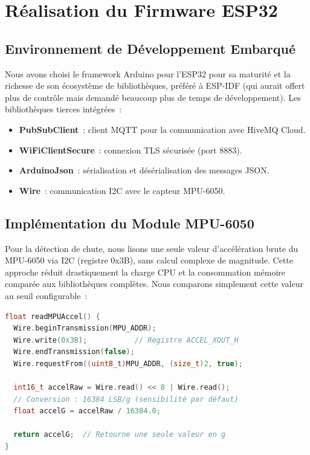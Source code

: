 \documentclass[12pt, a4paper]{report}
\begin{document}
\section{Réalisation du Firmware ESP32}

\subsection{Environnement de Développement Embarqué}

Nous avons choisi le framework Arduino pour l'ESP32 pour sa maturité et la richesse
de son écosystème de bibliothèques, préféré à ESP-IDF (qui aurait offert plus de
contrôle mais demandé beaucoup plus de temps de développement). Les bibliothèques
tierces intégrées~:

\begin{itemize}
  \item \textbf{PubSubClient}~: client MQTT pour la communication avec HiveMQ Cloud.
  \item \textbf{WiFiClientSecure}~: connexion TLS sécurisée (port 8883).
  \item \textbf{ArduinoJson}~: sérialisation et désérialisation des messages JSON.
  \item \textbf{Wire}~: communication I2C avec le capteur MPU-6050.
\end{itemize}

\subsection{Implémentation du Module MPU-6050}

Pour la détection de chute, nous lisons une seule valeur d'accélération brute du
MPU-6050 via I2C (registre 0x3B), sans calcul complexe de magnitude. Cette approche
réduit drastiquement la charge CPU et la consommation mémoire comparée aux bibliothèques
complètes. Nous comparons simplement cette valeur au seuil configurable~:

\begin{lstlisting}[language=C++, caption={Lecture de l'accélération brute depuis le MPU-6050}]
float readMPUAccel() {
  Wire.beginTransmission(MPU_ADDR);
  Wire.write(0x3B);           // Registre ACCEL_XOUT_H
  Wire.endTransmission(false);
  Wire.requestFrom((uint8_t)MPU_ADDR, (size_t)2, true);

  int16_t accelRaw = Wire.read() << 8 | Wire.read();
  // Conversion : 16384 LSB/g (sensibilité par défaut)
  float accelG = accelRaw / 16384.0;

  return accelG;  // Retourne une seule valeur en g
}
\end{lstlisting}
\end{document}
